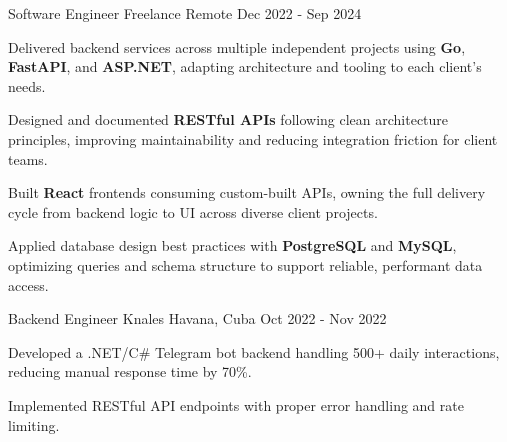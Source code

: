 \documentclass[]{awesome-cv}
\begin{document}
\begin{cventries}
  \cventry
    {Software Engineer}
    {Freelance}
    {Remote}
    {Dec 2022 - Sep 2024}
    {\begin{cvitems}
        \item Delivered backend services across multiple independent projects using \textbf{Go}, \textbf{FastAPI}, and \textbf{ASP.NET}, adapting architecture and tooling to each client's needs.
        \item Designed and documented \textbf{RESTful APIs} following clean architecture principles, improving maintainability and reducing integration friction for client teams.
        \item Built \textbf{React} frontends consuming custom-built APIs, owning the full delivery cycle from backend logic to UI across diverse client projects.
        \item Applied database design best practices with \textbf{PostgreSQL} and \textbf{MySQL}, optimizing queries and schema structure to support reliable, performant data access.
        \end{cvitems}}

  \cventry
    {Backend Engineer}
    {Knales}
    {Havana, Cuba}
    {Oct 2022 - Nov 2022}
    {\begin{cvitems}
        \item Developed a .NET/C\# Telegram bot backend handling 500+ daily interactions, reducing manual response time by 70\%.
        \item Implemented RESTful API endpoints with proper error handling and rate limiting.
      \end{cvitems}}
\end{cventries}
\end{document}
